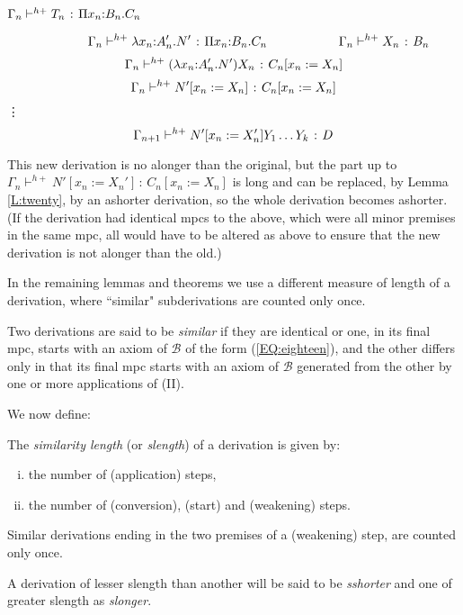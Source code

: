 \documentclass{LMCS}
\def\:{\mathbin{\,:\,}}
\begin{document}
{\small
\hspace {3.6cm}$\Gamma_n\vdash^{h+} T_n\:\Pi x_n{:}B_n.C_n\vspace{-5mm}$

\vspace{2mm}\hspace{3.6cm}\hbox{\vrule height .4pt width 5.2cm}\vspace{-2mm}
$$\qquad\quad\quad\Gamma_n\vdash^{h+} \lambda x_n{:}A_n'.N'\:\Pi 
x_n{:}B_n.C_n\hspace {2cm}\Gamma_n\vdash^{h+} X_n\:B_n\vspace{-2mm}$$
\vspace{-2mm}\hspace{3cm}\hbox{\vrule height .4pt width 10cm}
$$\Gamma_n\vdash^{h+} (\lambda x_n{:}A_n'.N')X_n\:C_n[x_n:=X_n]\vspace{-2mm}$$
\vspace{-2mm}\hspace{4cm}\hbox{\vrule height .4pt width 9cm}
$$\Gamma_n\vdash^{h+} N'[x_n:=X_n]\:C_n[x_n:=X_n]\vspace{-2mm}$$
\hspace {7cm}\vdots
$$\Gamma_{n+1}\vdash^{h+} N'[x_n:=X_n']Y_1\dots Y_k\:D\vspace{-2mm}$$
}

 \noindent This new derivation is no alonger than the original, but
  the part up to $\Gamma_n\vdash^{h+} N'[x_n:=X_n']\:C_n[x_n:=X_n]$
  is long and can be replaced, by Lemma \ref{L:twenty}, by an ashorter
  derivation, so the whole derivation becomes ashorter. (If the
  derivation had identical mpcs to the above, which were all minor
  premises in the same mpc, all would have to be altered as above to
  ensure that the new derivation is not alonger than the old.)

  In the remaining lemmas and theorems we use a different measure of
  length of a derivation, where ``similar" subderivations are counted
  only once.

\begin{defi}[Similar]\label{D:sim}
  Two derivations are said to be  \emph{similar} if they are identical
  or one, in its final mpc, starts with an axiom of $\mathcal B$ of
  the form (\ref{EQ:eighteen}), and the other differs only in that its
  final mpc starts with an axiom of $\mathcal B$ generated from the
  other by one or more applications of (II).
\end{defi}

  We now define:

\begin{defi}\label{D:simlen}
  The  \emph{similarity length} (or  \emph{slength}) of a derivation is
  given by:
\begin{enumerate}[(i)]
\item the number of (application) steps,
\item the number of (conversion), (start) and (weakening) steps.
\end{enumerate}
  Similar derivations ending in the two premises of a (weakening)
  step, are counted only once.

  A derivation of lesser slength than another will be said to be
  \emph{sshorter} and one of greater slength as  \emph{slonger}.
\end{defi}
\end{document}
